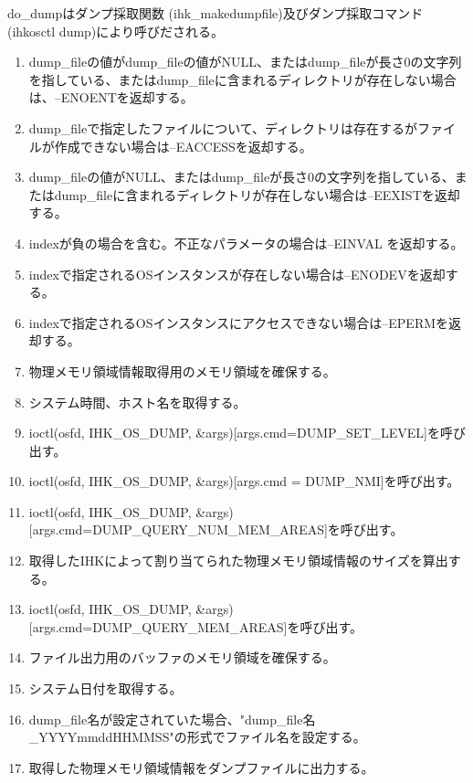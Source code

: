 \documentclass[twoside,11pt,fleqn]{book}
\begin{document}
do\_dumpはダンプ採取関数 (ihk\_makedumpfile)及びダンプ採取コマンド(ihkosctl dump)により呼びだされる。
\begin{enumerate}
\item dump\_fileの値がdump\_fileの値がNULL、またはdump\_fileが長さ0の文字列を指している、またはdump\_fileに含まれるディレクトリが存在しない場合は、--ENOENTを返却する。
\item dump\_fileで指定したファイルについて、ディレクトリは存在するがファイルが作成できない場合は--EACCESSを返却する。
\item dump\_fileの値がNULL、またはdump\_fileが長さ0の文字列を指している、またはdump\_fileに含まれるディレクトリが存在しない場合は--EEXISTを返却する。
\item indexが負の場合を含む。不正なパラメータの場合は--EINVAL を返却する。
\item indexで指定されるOSインスタンスが存在しない場合は--ENODEVを返却する。
\item indexで指定されるOSインスタンスにアクセスできない場合は--EPERMを返却する。
\item 物理メモリ領域情報取得用のメモリ領域を確保する。
\item システム時間、ホスト名を取得する。
\item ioctl(osfd, IHK\_OS\_DUMP, \&args)[args.cmd=DUMP\_SET\_LEVEL]を呼び出す。
\item ioctl(osfd, IHK\_OS\_DUMP, \&args)[args.cmd = DUMP\_NMI]を呼び出す。
\item ioctl(osfd, IHK\_OS\_DUMP, \&args)[args.cmd=DUMP\_QUERY\_NUM\_MEM\_AREAS]を呼び出す。
\item 取得したIHKによって割り当てられた物理メモリ領域情報のサイズを算出する。
\item ioctl(osfd, IHK\_OS\_DUMP, \&args)[args.cmd=DUMP\_QUERY\_MEM\_AREAS]を呼び出す。
\item ファイル出力用のバッファのメモリ領域を確保する。
\item システム日付を取得する。
\item dump\_file名が設定されていた場合、"dump\_file名\_YYYYmmddHHMMSS"の形式でファイル名を設定する。
\item 取得した物理メモリ領域情報をダンプファイルに出力する。
\end{enumerate}
\end{document}
